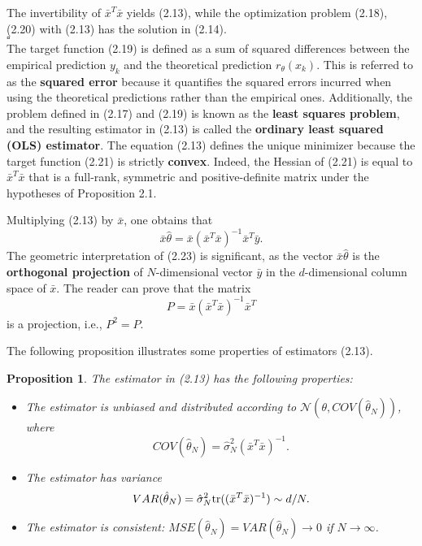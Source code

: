 \documentclass{report}
\newtheorem{proposition}{Proposition}[chapter]
\begin{document}
The invertibility of $\bar{x}^T\bar{x}$ yields (2.13), while the optimization problem (2.18), (2.20) with (2.13) has the solution in (2.14).\\
$\square$\\
The target function (2.19) is defined as a sum of squared differences between the empirical prediction $y_k$ and the theoretical prediction $r_\theta(x_k)$. This is referred to as the \textbf{squared error} because it quantifies the squared errors incurred when using the theoretical predictions rather than the empirical ones. Additionally, the problem defined in (2.17) and (2.19) is known as the \textbf{least squares problem}, and the resulting estimator in (2.13) is called the \textbf{ordinary least squared (OLS) estimator}. The equation (2.13) defines the unique minimizer because the target function (2.21) is strictly \textbf{convex}. Indeed, the Hessian of (2.21) is equal to $\bar{x}^T\bar{x}$ that is a full-rank, symmetric and positive-definite matrix under the hypotheses of Proposition 2.1.

Multiplying (2.13) by $\bar{x}$, one obtains that
\begin{equation}
\bar{x}\hat{\theta} = \bar{x}(\bar{x}^T\bar{x})^{-1}\bar{x}^T\bar{y}.
\end{equation}
The geometric interpretation of (2.23) is significant, as the vector $\bar{x}\hat{\theta}$ is the \textbf{orthogonal projection} of $N$-dimensional vector $\bar{y}$ in the $d$-dimensional column space of $\bar{x}$. The reader can prove that the matrix
\begin{equation}
P = \bar{x}(\bar{x}^T\bar{x})^{-1}\bar{x}^T
\end{equation}
is a projection, i.e., $P^2 = P$.

The following proposition illustrates some properties of estimators (2.13).

\begin{proposition}
The estimator in (2.13) has the following properties:
\begin{itemize}
\item The estimator is unbiased and distributed according to $\mathcal{N}(\theta, COV(\hat{\theta}_N))$, where
\begin{equation}
COV(\hat{\theta}_N) = \hat{\sigma}_N^2(\bar{x}^T\bar{x})^{-1}.
\end{equation}
\item The estimator has variance
\begin{equation}
VAR(\hat{\theta}_N) = \hat{\sigma}^2_N\textup{tr}((\bar{x}^T\bar{x})^{-1}) \sim d/N.
\end{equation}
\item The estimator is consistent: $MSE(\hat{\theta}_N) = VAR(\hat{\theta}_N) \to 0$ if $N \to \infty$.
\end{itemize}
\end{proposition}
\end{document}
